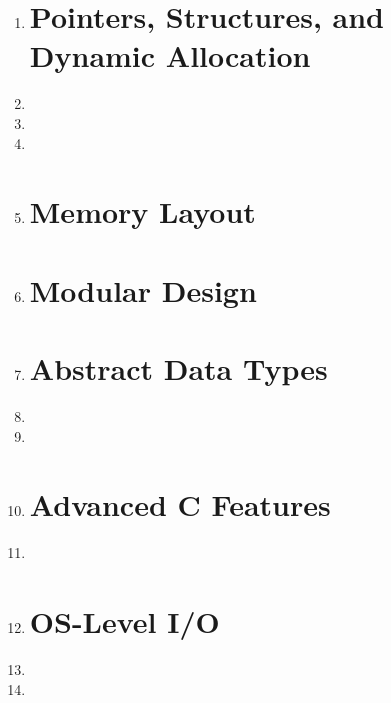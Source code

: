 \documentclass[11pt]{article}
\begin{document}
\begin{enumerate}
		\item 

		\vspace{.5in}
		\section*{Pointers, Structures, and Dynamic Allocation}
		\item 

		\newpage
		\item 

		\item 

		\item 

		\section*{Memory Layout}
		\item 

		\newpage
		\section*{Modular Design}
		\item 

		\section*{Abstract Data Types}
		\item 

		\item 

		\newpage
		\item 

		\newpage
		\section*{Advanced C Features}
		\item 

		\item 

		\section*{OS-Level I/O}
		\item 

		\item 
	\end{enumerate}
\end{document}
